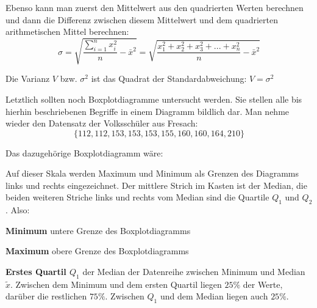 Ebenso kann man zuerst den Mittelwert aus den quadrierten Werten berechnen und dann die Differenz zwischen diesem Mittelwert und dem quadrierten arithmetischen Mittel berechnen: $$\sigma = \sqrt{\frac{\sum_{i=1}^{n} x_{i}^2}{n} - \bar{x}^2} = \sqrt{\frac{x_{1}^2 + x_{2}^2 + x_{3}^2 + ... + x_{n}^2}{n} - \bar{x}^2}$$

Die Varianz $V$ bzw. $\sigma^2$ ist das Quadrat der Standardabweichung: $V = \sigma^2$

\pagebreak


Letztlich sollten noch Boxplotdiagramme untersucht werden. Sie stellen alle bis hierhin beschriebenen Begriffe in einem Diagramm bildlich dar. Man nehme wieder den Datensatz der Volkssch\"{u}ler aus Fresach: $$\{ 112, 112, 153, 153, 153, 155, 160, 160, 164, 210\}$$

Das dazugeh\"{o}rige Boxplotdiagramm w\"{a}re:

\extrapar

\begin{figure}[h!]
\end{figure}

Auf dieser Skala werden Maximum und Minimum als Grenzen des Diagramms links und rechts eingezeichnet. Der mittlere Strich im Kasten ist der Median, die beiden weiteren Striche links und rechts vom Median sind die Quartile $Q_{1}$ und $Q_{2}$. Also:

\textbf{Minimum}  untere Grenze des Boxplotdiagramms

\textbf{Maximum}  obere Grenze des Boxplotdiagramms

\textbf{Erstes Quartil $Q_{1}$}  der Median der Datenreihe zwischen Minimum und Median $\tilde{x}$. Zwischen dem Minimum und dem ersten Quartil liegen $25\%$ der Werte, dar\"{u}ber die restlichen $75\%$. Zwischen $Q_{1}$ und dem Median liegen auch $25\%$.


